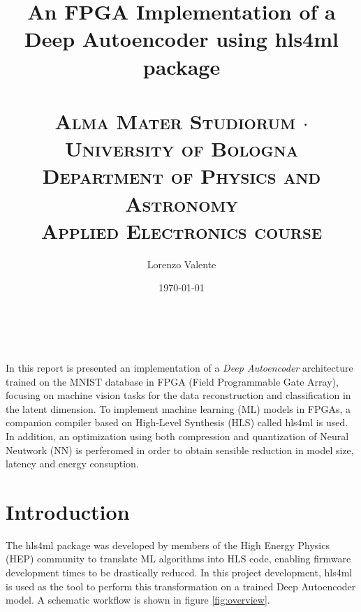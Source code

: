 \documentclass{article}
\title{
  \huge{\textbf{An FPGA Implementation of a\\ Deep Autoencoder using hls4ml package \\}}
  \Large{\textsc{\\ Alma Mater Studiorum $\cdot$ University of Bologna \\ }}
  \large{\textsc{Department of Physics and Astronomy \\}}
  \normalsize{\textsc{Applied Electronics course}}
  } %
\author{Lorenzo Valente} %
\date{\today} %
\begin{document}
\maketitle %

\begin{center}
\begin{tabular}{l r}
\end{tabular}
\end{center}



\section*{}
In this report is presented an implementation of a \textit{Deep Autoencoder} 
architecture trained on the MNIST database in FPGA (Field Programmable Gate Array), 
focusing on machine vision tasks for the data reconstruction and classification in the latent dimension.
To implement machine learning (ML) models in FPGAs, a companion compiler 
based on High-Level Synthesis (HLS) called hls4ml is used. 
In addition, an optimization using both compression and quantization of Neural Neutwork (NN) is perferomed in order to obtain 
sensible reduction in model size, latency and energy consuption.


\section{Introduction}

The hls4ml package was developed by members of the High Energy Physics (HEP) community
to translate ML algorithms into HLS code, enabling firmware development times to be drastically reduced.
In this project development, hls4ml is used as the tool to perform 
this transformation on a trained Deep Autoencoder model.
A schematic workflow is shown in figure \ref{fig:overview}.
\end{document}
